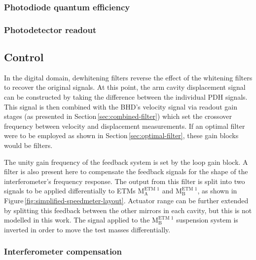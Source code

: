 \subsubsection{Photodiode quantum efficiency}

\subsubsection{Photodetector readout}

\subsection{Control}

In the digital domain, dewhitening filters reverse the effect of the whitening filters to recover the original signals. At this point, the arm cavity displacement signal can be constructed by taking the difference between the individual PDH signals. This signal is then combined with the BHD's velocity signal via readout gain stages (as presented in Section\,\ref{sec:combined-filter}) which set the crossover frequency between velocity and displacement measurements. If an optimal filter were to be employed as shown in Section\,\ref{sec:optimal-filter}, these gain blocks would be filters.

The unity gain frequency of the feedback system is set by the loop gain block. A filter is also present here to compensate the feedback signals for the shape of the interferometer's frequency response. The output from this filter is split into two signals to be applied differentially to ETMs $\textrm{M}_{\textrm{A}}^{\textrm{ETM 1}}$ and $\textrm{M}_{\textrm{B}}^{\textrm{ETM 1}}$, as shown in Figure\,\ref{fig:simplified-speedmeter-layout}. Actuator range can be further extended by splitting this feedback between the other mirrors in each cavity, but this is not modelled in this work. The signal applied to the $\textrm{M}_{\textrm{B}}^{\textrm{ETM 1}}$ suspension system is inverted in order to move the test masses differentially.

\subsubsection{Interferometer compensation}

